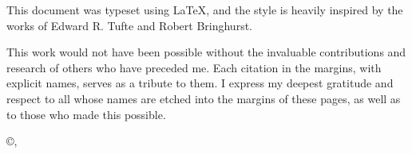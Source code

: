 \cleardoublepage
\thispagestyle{empty}
\hfill
\vfill
\noindent This document was typeset using \LaTeX{}, and the style is heavily inspired by the works of Edward R. Tufte and Robert Bringhurst.
    \par
This work would not have been possible without the invaluable contributions and research of others who have preceded me. Each citation in the margins, with explicit names, serves as a tribute to them. I express my deepest gratitude and respect to all whose names are etched into the margins of these pages, as well as to those who made this possible.

    
    \vspace{3em}
    \noindent\textit{\MyTitle}
    
    \noindent\copyright \MyDate, \MyAuthor
\cleardoublepage